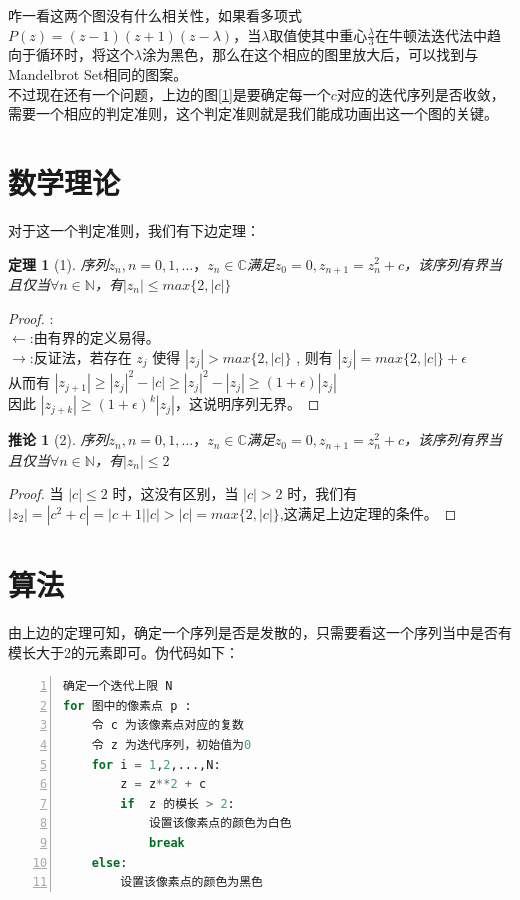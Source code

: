 \documentclass{ctexart}
\newtheorem{corollary}{推论}
\newtheorem{theorem}{定理}
\begin{document}
\indent 咋一看这两个图没有什么相关性，如果看多项式$P(z) = (z - 1)(z + 1)(z - \lambda)$，当$\lambda$取值使其中重心$\frac{\lambda}{3}$在牛顿法迭代法中趋向于循环时，将这个$\lambda$涂为黑色，那么在这个相应的图里放大后，可以找到与Mandelbrot Set相同的图案。\\
\indent 不过现在还有一个问题，上边的图\ref{1}是要确定每一个$c$对应的迭代序列是否收敛，需要一个相应的判定准则，这个判定准则就是我们能成功画出这一个图的关键。

\section{数学理论}
\indent 对于这一个判定准则，我们有下边定理：
\begin{theorem}[1]
	序列{$z_n,n=0,1,\dots，z_n \in \mathbb{C}$}满足$z_0 = 0, z_{n+1} = z_n^2 + c$，该序列有界当且仅当$\forall n \in \mathbb{N}$，有$|z_n| \le max\{2,|c|\}$
\end{theorem}
\begin{proof}
	:\\
	$\leftarrow$:由有界的定义易得。\\
	$\rightarrow$:反证法，若存在 $z_j$ 使得 $|z_j| > max\{2,|c|\}$ , 则有 $|z_j| = max\{2,|c|\} + \epsilon$ \\
	\indent 从而有 $|z_{j+1}| \ge |z_j|^2 - |c| \ge |z_j|^2 - |z_j| \ge (1 + \epsilon)|z_j|$\\
	\indent 因此 $|z_{j+k}| \ge (1 + \epsilon)^k|z_j|$，这说明序列无界。
\end{proof}
\begin{corollary}[2]
	序列{$z_n,n=0,1,\dots，z_n \in \mathbb{C}$}满足$z_0 = 0, z_{n+1} = z_n^2 + c$，该序列有界当且仅当$\forall n \in \mathbb{N}$，有$|z_n| \le 2$
\end{corollary}
\begin{proof}
	当 $|c| \le 2$ 时，这没有区别，当 $|c| > 2$ 时，我们有 $|z_2| = |c^2 + c| = |c + 1||c| > |c| = max\{2,|c|\}$,这满足上边定理的条件。
\end{proof}

\section{算法}
\indent 由上边的定理可知，确定一个序列是否是发散的，只需要看这一个序列当中是否有模长大于2的元素即可。伪代码如下：
\begin{lstlisting}[language = Python, numbers=left,breaklines=true,
         numberstyle=\tiny,keywordstyle=\color{blue!70},
         commentstyle=\color{red!50!green!50!blue!50},frame=shadowbox,
         rulesepcolor=\color{red!20!green!20!blue!20},basicstyle={\ttfamily\footnotesize}]
确定一个迭代上限 N
for 图中的像素点 p :
    令 c 为该像素点对应的复数
    令 z 为迭代序列，初始值为0
    for i = 1,2,...,N:
        z = z**2 + c
        if  z 的模长 > 2:
			设置该像素点的颜色为白色
			break
    else:
        设置该像素点的颜色为黑色
 \end{lstlisting}
\end{document}
